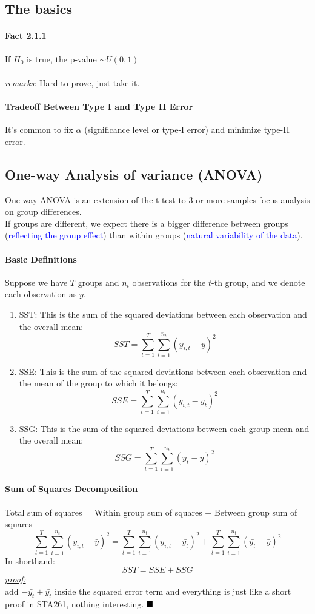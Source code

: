 \documentclass[11pt]{article}
\newcommand{\ti}[1]{\textit{#1}}
\newcommand{\under}[1]{\underline{#1}}
\newcommand{\proof}[0]{\textit{\underline{proof:} }}
\newcommand{\qed}[0]{$\hfill\blacksquare$}
\begin{document}
\subsection{The basics}
\paragraph{Fact 2.1.1} If $H_0$ is true, the p-value $\sim U(0,1)$ \\\\
\under{\ti{remarks}}: Hard to prove, just take it.
\paragraph{Tradeoff Between Type I and Type II Error}
It's common to fix $\alpha$ (significance level or type-I error) and minimize type-II error.
\subsection{One-way Analysis of variance (ANOVA)}
One-way ANOVA is an extension of the t-test to 3 or more samples focus analysis on group differences.\\
If groups are different, we expect there is a bigger difference between groups (\textcolor{blue}{reflecting the group effect}) than within groups (\textcolor{blue}{natural variability of the data}).
\paragraph{Basic Definitions}
Suppose we have $T$ groups and $n_t$ observations for the $t$-th group, and we denote each observation as $y$.
\begin{enumerate}
	\item \under{SST}: This is the sum of the squared deviations between each observation and the overall mean:
	$$SST = \sum_{t=1}^T\sum_{i=1}^{n_t}(y_{i,t}-\bar{y})^2$$
	\item \under{SSE}: This is the sum of the squared deviations between each observation and the mean of the group to which it belongs:
	$$SSE = \sum_{t=1}^T\sum_{i=1}^{n_t}(y_{i,t}-\bar{y_t})^2$$
	\item \under{SSG}: This is the sum of the squared deviations between each group mean and the overall mean:
	$$SSG = \sum_{t=1}^T\sum_{i=1}^{n_t}(\bar{y_t}-\bar{y})^2$$
\end{enumerate}

\paragraph{Sum of Squares Decomposition}
Total sum of squares = Within group sum of squares + Between group sum of squares \\
$$\sum_{t=1}^T\sum_{i=1}^{n_t}(y_{i,t}-\bar{y})^2 = \sum_{t=1}^T\sum_{i=1}^{n_t}(y_{i,t}-\bar{y_t})^2 + \sum_{t=1}^T\sum_{i=1}^{n_t}(\bar{y_t}-\bar{y})^2$$
In shorthand:
$$SST = SSE + SSG$$
\proof\\
add $-\bar{y_t}+\bar{y_t}$ inside the squared error term and everything is just like a short proof in STA261, nothing interesting. \qed
\end{document}
